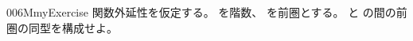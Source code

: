 \documentclass[index]{subfiles}
\begin{document}
\begin{myBlock}{006M}{myExercise}
  関数外延性を仮定する。
  を階数、
  を前圏とする。
  と
  の間の前圏の同型を構成せよ。
\end{myBlock}
\end{document}
